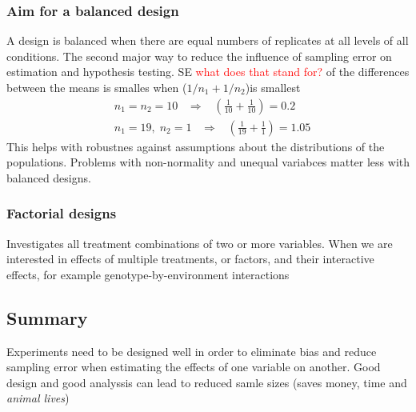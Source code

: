 \documentclass{article}
\begin{document}
\subsubsection{Aim for a balanced design}
A design is balanced when there are equal numbers of replicates at all levels of all conditions. The second major way to reduce the influence of sampling error on estimation and hypothesis testing. SE \textcolor{red}{what does that stand for?} of the differences between the means is smalles when ($1/n_1 + 1/n_2$)is smallest
\begin{equation*}
\begin{split}
& n_1 = n_2 = 10 \;\;\; \Rightarrow \;\;\; ( \frac{1}{10} +\frac{1}{10} ) = 0.2 \\
& n_1 = 19,\; n_2 = 1 \;\;\; \Rightarrow \;\;\;(\frac{1}{19} + \frac{1}{1})= 1.05
\end{split}
\end{equation*}
This helps with robustnes against assumptions about the distributions of the populations. Problems with non-normality and unequal variabces matter less with balanced designs.

\subsubsection{Factorial designs}
Investigates all treatment combinations of two or more variables. When we are interested in effects of multiple treatments, or factors, and their interactive effects, for example genotype-by-environment interactions

\subsection{Summary}
Experiments need to be designed well in order to eliminate bias and reduce sampling error when estimating the effects of one variable on another. Good design and good analyssis can lead to reduced samle sizes (saves money, time and \textit{animal lives})
\end{document}
